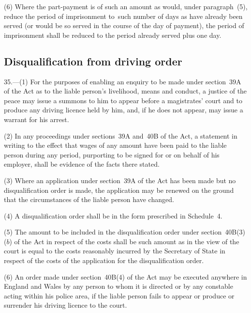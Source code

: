 \documentclass[12pt,a4paper]{article}
\begin{document}
(6) Where the part-payment is of such an amount as would, under paragraph~(5), reduce the period of imprisonment to~such number of days as have already been served (or would be so served in the course of the day of payment), the period of imprisonment shall be reduced to the period already served plus one day.

\subsection[35. Disqualification from driving order]{Disqualification from driving order}

35.---(1)  For the purposes of enabling an enquiry to be made under section~39A of the Act as to the liable person’s livelihood, means and conduct, a justice of the peace 
may issue a summons to him to appear before a magistrates' court and to produce any driving licence held by him, 
and, if he does not appear, may issue a warrant for his arrest.

(2) In any proceedings under sections~39A and~40B of the Act, a statement in writing to the effect that wages of any amount have been paid to the liable person during any period, purporting to be signed for or on behalf of his employer, shall be evidence of the facts there stated.

(3) Where an application under section~39A of the Act has been made but no disqualification order is made, the application may be renewed on the ground that the circumstances of the liable person have changed.

(4) A disqualification order shall be in the form prescribed in Schedule~4.

(5) The amount to be included in the disqualification order under section~40B(3)($b$)  of the Act in respect of the costs shall be such amount as in the view of the court is equal to the costs reasonably incurred by the Secretary of State in respect of the costs of the application for the disqualification order.

(6) An order made under section~40B(4) of the Act may be executed anywhere in England and Wales by any person to whom it is directed or by any constable acting within his police area, if the liable person fails to appear or produce or surrender his driving licence 
to the court.
\end{document}
